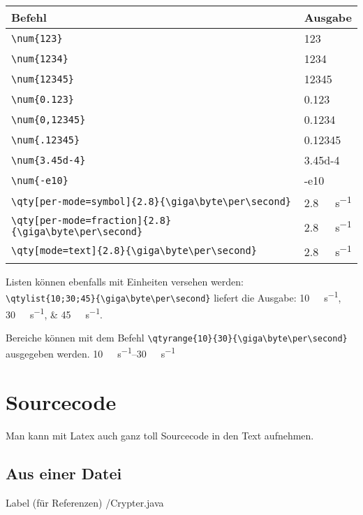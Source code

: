\begin{tabular}{|l|l|}
	\hline
	\textbf{Befehl} & \textbf{Ausgabe}  \\\hline
	\verb*|\num{123}| & \num{123} \\
	\verb*|\num{1234}| &	\num{1234} \\
	\verb*|\num{12345}| &	\num{12345} \\
	\verb*|\num{0.123}| &	\num{0.123} \\
	\verb*|\num{0,12345}| &	\num{0,1234} \\
	\verb*|\num{.12345}| &	\num{.12345} \\
	\verb*|\num{3.45d-4}| &	\num{3.45d-4} \\
	\verb*|\num{-e10}| &	\num{-e10} \\
	\verb*|\qty[per-mode=symbol]{2.8}{\giga\byte\per\second}| & \qty[per-mode = symbol]{2.8}{\giga\byte\per\second}\\
	\verb*|\qty[per-mode=fraction]{2.8}{\giga\byte\per\second}| & \qty[per-mode = fraction]{2.8}{\giga\byte\per\second}\\
	\verb*|\qty[mode=text]{2.8}{\giga\byte\per\second}| & \qty[mode = text]{2.8}{\giga\byte\per\second}\\\hline
\end{tabular}

\vspace*{0.75cm}

Listen können ebenfalls mit Einheiten versehen werden:\\ \verb*|\qtylist{10;30;45}{\giga\byte\per\second}| liefert die Ausgabe: \qtylist{10;30;45}{\giga\byte\per\second}. 

Bereiche können mit dem Befehl \verb*|\qtyrange{10}{30}{\giga\byte\per\second}| ausgegeben werden. \qtyrange{10}{30}{\giga\byte\per\second}


\section{Sourcecode}

Man kann mit Latex auch ganz toll Sourcecode in den Text aufnehmen.

\subsection{Aus einer Datei}

 Label (für Referenzen)
                 {\srcloc/Crypter.java}       %

